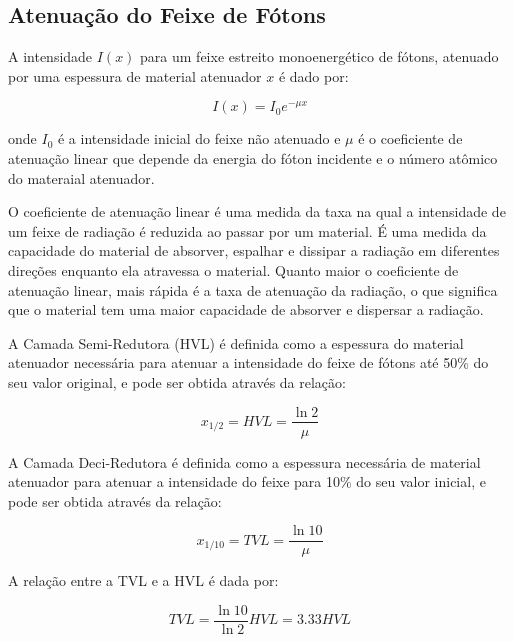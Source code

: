 \documentclass[11pt,a4paper]{article}
\begin{document}
        \subsection{Atenuação do Feixe de Fótons}

            A intensidade $I(x)$ para um feixe estreito monoenergético de fótons, atenuado por uma espessura de material atenuador $x$ é dado por:

                \begin{equation}
                    I(x) = I_0 e^{-\mu x}
                \end{equation}
            
            \noindent onde $I_0$ é a intensidade inicial do feixe não atenuado e $\mu$ é o coeficiente de atenuação linear que depende da energia do fóton incidente e o número atômico do materaial atenuador.

            O coeficiente de atenuação linear é uma medida da taxa na qual a intensidade de um feixe de radiação é reduzida ao passar por um material. É uma medida da capacidade do material de absorver, espalhar e dissipar a radiação em diferentes direções enquanto ela atravessa o material. Quanto maior o coeficiente de atenuação linear, mais rápida é a taxa de atenuação da radiação, o que significa que o material tem uma maior capacidade de absorver e dispersar a radiação.

            A Camada Semi-Redutora (HVL) é definida como a espessura do material atenuador necessária para atenuar a intensidade do feixe de fótons até 50\% do seu valor original, e pode ser obtida através da relação:

                \begin{equation}
                    x_{1/2} = HVL = \frac{\ln 2}{\mu}
                \end{equation}
            

            A Camada Deci-Redutora é definida como a espessura necessária de material atenuador para atenuar a intensidade do feixe para 10\% do seu valor inicial, e pode ser obtida através da relação:

                \begin{equation}
                    x_{1/10} = TVL = \frac{\ln 10}{\mu}
                \end{equation}

            A relação entre a TVL e a HVL é dada por:

            \begin{equation}
                TVL = \frac{\ln 10}{ \ln 2} HVL = 3.33 HVL
            \end{equation}
\end{document}
